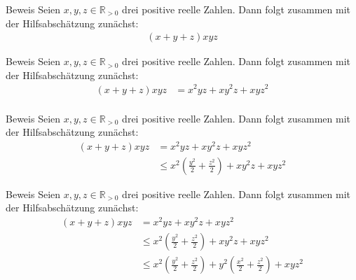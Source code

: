 \documentclass[10pt]{beamer}
\def\bR{\mathbb{R}}
\begin{document}
\begin{frame}{Beweis}
    Seien \( x, y, z \in \bR_{> 0} \) drei positive reelle Zahlen. Dann folgt zusammen mit der Hilfsabschätzung zunächst:
    \begin{align*}
        \left( x + y + z \right)xyz
    \end{align*}
\end{frame}



\begin{frame}{Beweis}
    Seien \( x, y, z \in \bR_{> 0} \) drei positive reelle Zahlen. Dann folgt zusammen mit der Hilfsabschätzung zunächst:
    \begin{align*}
        \left( x + y + z \right)xyz
        & = x^{2}yz + xy^{2}z + xyz^{2} \\
    \end{align*}
\end{frame}



\begin{frame}{Beweis}
    Seien \( x, y, z \in \bR_{> 0} \) drei positive reelle Zahlen. Dann folgt zusammen mit der Hilfsabschätzung zunächst:
    \begin{align*}
        \left( x + y + z \right)xyz
        & = x^{2}yz + xy^{2}z + xyz^{2} \\
        & \leq x^{2} \left( \frac{y^{2}}{2} + \frac{z^{2}}{2} \right) + xy^{2}z + xyz^{2}
    \end{align*}
\end{frame}



\begin{frame}{Beweis}
    Seien \( x, y, z \in \bR_{> 0} \) drei positive reelle Zahlen. Dann folgt zusammen mit der Hilfsabschätzung zunächst:
    \begin{align*}
        \left( x + y + z \right)xyz
        & = x^{2}yz + xy^{2}z + xyz^{2} \\
        & \leq x^{2} \left( \frac{y^{2}}{2} + \frac{z^{2}}{2} \right) + xy^{2}z + xyz^{2} \\
        & \leq x^{2} \left( \frac{y^{2}}{2} + \frac{z^{2}}{2} \right) + y^{2} \left( \frac{x^{2}}{2} + \frac{z^{2}}{2} \right) + xyz^{2}
    \end{align*}
\end{frame}
\end{document}
